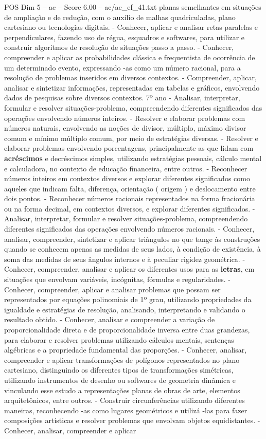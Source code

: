 \begin{textsample}{POS Dim 5 – ac – Score 6.00 – ac/ac\_ef\_41.txt}
planas semelhantes em situações de ampliação e de redução, com o auxílio de malhas quadriculadas, plano cartesiano ou tecnologias digitais. - Conhecer, aplicar e analisar retas paralelas e perpendiculares, fazendo uso de régua, esquadros e softwares, para utilizar e construir algoritmos de resolução de situações passo a passo. - Conhecer, compreender e aplicar as probabilidades clássica e frequentista de ocorrência de um determinado evento, expressando -as como um número racional, para a resolução de problemas inseridos em diversos contextos. - Compreender, aplicar, analisar e sintetizar informações, representadas em tabelas e gráficos, envolvendo dados de pesquisas sobre diversos contextos. 7º ano - Analisar, interpretar, formular e resolver situações-problema, compreendendo diferentes significados das operações envolvendo números inteiros. - Resolver e elaborar problemas com números naturais, envolvendo as noções de divisor, múltiplo, máximo divisor comum e mínimo múltiplo comum, por meio de estratégias diversas. - Resolver e elaborar problemas envolvendo porcentagens, principalmente as que lidam com \textbf{acréscimos} e decréscimos simples, utilizando estratégias pessoais, cálculo mental e calculadora, no contexto de educação financeira, entre outros. - Reconhecer números inteiros em contextos diversos e explorar diferentes significados como aqueles que indicam falta, diferença, orientação ( origem ) e deslocamento entre dois pontos. - Reconhecer números racionais representados na forma fracionária ou na forma decimal, em contextos diversos, e explorar diferentes significados. - Analisar, interpretar, formular e resolver situações-problema, compreendendo diferentes significados das operações envolvendo números racionais. - Conhecer, analisar, compreender, sintetizar e aplicar triângulos no que tange às construções quando se conhecem apenas as medidas de seus lados, à condição de existência, à soma das medidas de seus ângulos internos e à peculiar rigidez geométrica. - Conhecer, compreender, analisar e aplicar os diferentes usos para as \textbf{letras}, em situações que envolvam variáveis, incógnitas, fórmulas e regularidades. - Conhecer, compreender, aplicar e analisar problemas que possam ser representados por equações polinomiais de 1º grau, utilizando propriedades da igualdade e estratégias de resolução, analisando, interpretando e validando o resultado obtido. - Conhecer, analisar e compreender a variação de proporcionalidade direta e de proporcionalidade inversa entre duas grandezas, para elaborar e resolver problemas utilizando cálculos mentais, sentenças algébricas e a propriedade fundamental das proporções. - Conhecer, analisar, compreender e aplicar transformações de polígonos representados no plano cartesiano, distinguindo os diferentes tipos de transformações simétricas, utilizando instrumentos de desenho ou softwares de geometria dinâmica e vinculando esse estudo a representações planas de obras de arte, elementos arquitetônicos, entre outros. - Construir circunferências utilizando diferentes maneiras, reconhecendo -as como lugares geométricos e utilizá -las para fazer composições artísticas e resolver problemas que envolvam objetos equidistantes. - Conhecer, analisar, compreender e aplicar 
\end{textsample}
